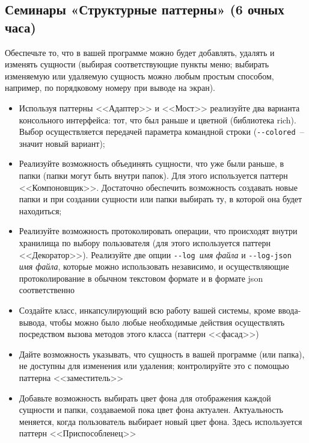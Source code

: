 \subsection{Семинары «Структурные паттерны» (6 очных часа)}

Обеспечьте то, что в вашей программе можно будет добавлять, удалять и изменять сущности (выбирая соответствующие пункты меню;
выбирать изменяемую или удаляемую сущность можно любым простым способом, например, по порядковому 
номеру при выводе на экран).

\begin{itemize}
   \item Используя паттерны <<Адаптер>> и <<Мост>> реализуйте два варианта консольного интерфейса: тот, что был раньше и
   цветной (библиотека rich). Выбор осуществляется передачей 
   параметра командной строки (\verb|--colored |-- значит новый вариант);
   \item Реализуйте возможность объединять сущности, что уже были раньше, 
   в папки (папки могут быть внутри папок). Для этого
   используется паттерн <<Компоновщик>>. Достаточно обеспечить возможность создавать новые папки и при создании сущности или 
   папки выбирать ту, в которой она будет находиться; 
   \item Реализуйте возможность протоколировать операции, что происходят внутри 
   хранилища по выбору 
   пользователя (для этого используется паттерн <<Декоратор>>). 
   Реализуйте две опции \verb|--log |\textit{имя файла} и 
   \verb|--log-json |\textit{имя файла}, которые можно использовать 
   независимо, и осуществляющие протоколирование в обычном
   текстовом формате и в формате json соответственно
   \item Создайте класс, инкапсулирующий всю работу вашей системы, кроме ввода-вывода, 
   чтобы можно было любые необходимые действия
   осуществлять посредством вызова методов этого класса (паттерн <<фасад>>)
   \item Дайте возможность указывать, что сущность в вашей программе (или папка), 
   не доступны для изменения или удаления; контролируйте
   это с помощью паттерна <<заместитель>>
   \item Добавьте возможность выбирать цвет фона для отображения каждой 
   сущности и папки, создаваемой пока цвет фона актуален.
   Актуальность меняется, когда пользователь выбирает новый цвет фона. 
   Здесь используется паттерн <<Приспособленец>>
\end{itemize}
